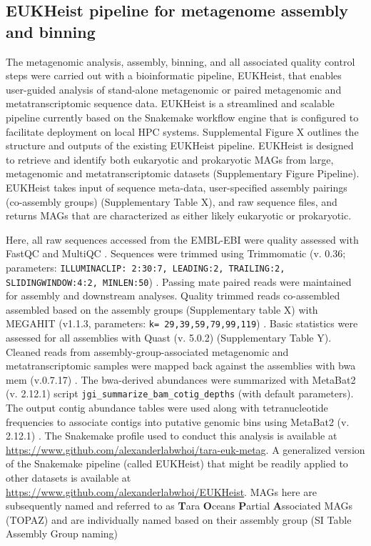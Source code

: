 \documentclass[12pt]{article}
\numberwithin{equation}{section}
\begin{document}
\subsection*{EUKHeist pipeline for metagenome assembly and binning}The metagenomic analysis, assembly, binning, and all associated quality control steps were carried out with a bioinformatic pipeline, EUKHeist, that enables user-guided analysis of stand-alone metagenomic or paired metagenomic and metatranscriptomic sequence data. EUKHeist is a streamlined and scalable pipeline currently based on the Snakemake workflow engine \citep{Koster2012} that is configured to facilitate deployment on local HPC systems.  Supplemental Figure X outlines the structure and outputs of the existing EUKHeist pipeline. EUKHeist is designed to retrieve and identify both eukaryotic and prokaryotic MAGs from large, metagenomic and metatranscriptomic datasets (Supplementary Figure Pipeline). EUKHeist takes input of sequence meta-data, user-specified assembly pairings (co-assembly groups) (Supplementary Table X), and raw sequence files, and returns MAGs that are characterized as either likely eukaryotic or prokaryotic. 

Here, all raw sequences accessed from the EMBL-EBI were quality assessed with FastQC and MultiQC \citep{Andrews2010FastQC}. Sequences were trimmed using Trimmomatic (v. 0.36; parameters: \texttt{ILLUMINACLIP: 2:30:7, LEADING:2, TRAILING:2, SLIDINGWINDOW:4:2, MINLEN:50}) \citep{Bolger2014Trimmomatic}. Passing mate paired reads were maintained for assembly and downstream analyses. Quality trimmed reads co-assembled assembled based on the assembly groups (Supplementary table X) with MEGAHIT (v1.1.3, parameters: \texttt{k= 29,39,59,79,99,119}) \citep{Li2015MEGAHIT}. Basic statistics were assessed for all assemblies with Quast (v. 5.0.2) \citep{Gurevich_2013} (Supplementary Table Y). Cleaned reads from assembly-group-associated metagenomic and metatranscriptomic samples were mapped back against the assemblies with bwa mem (v.0.7.17) \citep{Li2010Fast}. The bwa-derived abundances were summarized with MetaBat2 (v. 2.12.1) script \texttt{jgi\_summarize\_bam\_cotig\_depths} (with default parameters). The output contig abundance tables were used along with tetranucleotide frequencies to associate contigs into putative genomic bins using MetaBat2 (v. 2.12.1) \citep{Kang_2019}. The Snakemake profile used to conduct this analysis is available at \url{https://www.github.com/alexanderlabwhoi/tara-euk-metag}. A generalized version of the Snakemake pipeline (called EUKHeist) that might be readily applied to other datasets is available at \url{https://www.github.com/alexanderlabwhoi/EUKHeist}. MAGs here are subsequently named and referred to as \textbf{T}ara \textbf{O}ceans \textbf{P}artial \textbf{A}ssociated MAGs (TOPAZ) and are individually named based on their assembly group (SI Table Assembly Group naming)
\end{document}
